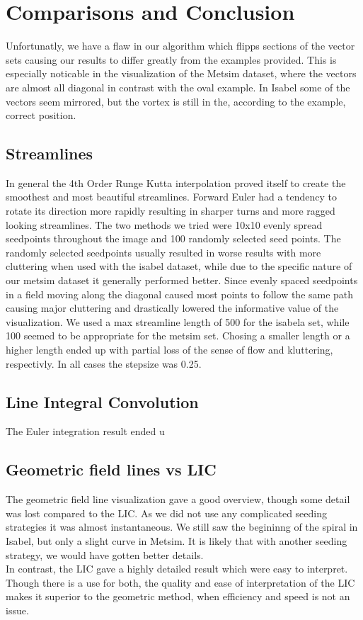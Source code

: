 \documentclass[11pt,a4paper,english]{article}
\numberwithin{equation}{section}
\begin{document}

\section{Comparisons and Conclusion}

Unfortunatly, we have a flaw in our algorithm which flipps sections of the vector sets causing our results to differ greatly from the examples provided. This is especially noticable in the visualization of the Metsim dataset, where the vectors are almost all diagonal in contrast with the oval example. In Isabel some of the vectors seem mirrored, but the vortex is still in the, according to the example, correct position. 

\subsection{Streamlines}
In general the 4th Order Runge Kutta interpolation proved itself to create the smoothest and most beautiful streamlines. Forward Euler had a tendency to rotate its direction more rapidly resulting in sharper turns and more ragged looking streamlines. The two methods we tried were 10x10 evenly spread seedpoints throughout the image and 100 randomly selected seed points. The randomly selected seedpoints usually resulted in worse results with more cluttering when used with the isabel dataset, while due to the specific nature of our metsim dataset it generally performed better. Since evenly spaced seedpoints in a field moving along the diagonal caused most points to follow the same path causing major cluttering and drastically lowered the informative value of the visualization. We used a max streamline length of 500 for the isabela set, while 100 seemed to be appropriate for the metsim set. Chosing a smaller length or a higher length ended up with partial loss of the sense of flow and kluttering, respectivly. In all cases the stepsize was 0.25.

\subsection{Line Integral Convolution}
The Euler integration result ended u


\subsection{Geometric field lines vs LIC}
The geometric field line visualization gave a good overview, though some detail was lost compared to the LIC. As we did not use any complicated seeding strategies it was almost instantaneous. We still saw the begininng of the spiral in Isabel, but only a slight curve in Metsim. It is likely that with another seeding strategy, we would have gotten better details.
\\
In contrast, the LIC gave a highly detailed result which were easy to interpret. Though there is a use for both, the quality and ease of interpretation of the LIC makes it superior to the geometric method, when efficiency and speed is not an issue.
\end{document}
